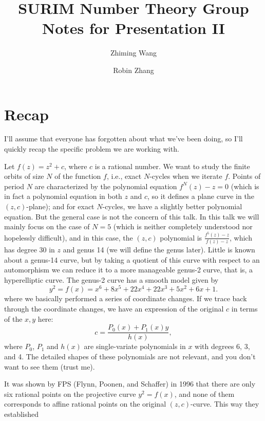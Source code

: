 


\title{SURIM Number Theory Group\\Notes for Presentation II}

\author{Zhiming Wang}
\author{Robin Zhang}



\maketitle

\section{Recap}

I'll assume that everyone has forgotten about what we've been doing,
so I'll quickly recap the specific problem we are working with.

Let $f(z) = z^2 + c$, where $c$ is a rational number. We want to study
the finite orbits of size $N$ of the function $f$, i.e., exact
$N$-cycles when we iterate $f$. Points of period $N$ are characterized
by the polynomial equation $f^N(z) - z = 0$ (which is in fact a
polynomial equation in both $z$ and $c$, so it defines a plane curve
in the $(z, c)$-plane); and for exact $N$-cycles, we have a slightly
better polynomial equation. But the general case is not the concern of
this talk. In this talk we will mainly focus on the case of $N = 5$
(which is neither completely understood nor hopelessly difficult), and
in this case, the $(z, c)$ polynomial is $\frac{f^5(z) - z}{f(z) -
  z}$, which has degree 30 in $z$ and genus 14 (we will define the
genus later). Little is known about a genus-14 curve, but by taking a
quotient of this curve with respect to an automorphism we can reduce
it to a more manageable genus-2 curve, that is, a hyperelliptic
curve. The genus-2 curve has a smooth model given by
\[
y^2 = f(x) = x^6 + 8x^5 + 22x^4 + 22x^3 + 5x^2 + 6x + 1.
\]
where we basically performed a series of coordinate changes. If we
trace back through the coordinate changes, we have an expression of
the original $c$ in terms of the $x, y$ here:
\[
c = \frac{P_0(x) + P_1(x) y}{h(x)},
\]
where $P_0$, $P_1$ and $h(x)$ are single-variate polynomials in $x$
with degrees 6, 3, and 4. The detailed shapes of these polynomials are
not relevant, and you don't want to see them (trust me).

It was shown by FPS (Flynn, Poonen, and Schaffer) in 1996 that there
are only six rational points on the projective curve $y^2 = f(x)$, and
none of them corresponds to affine rational points on the original
$(z, c)$-curve. This way they established

